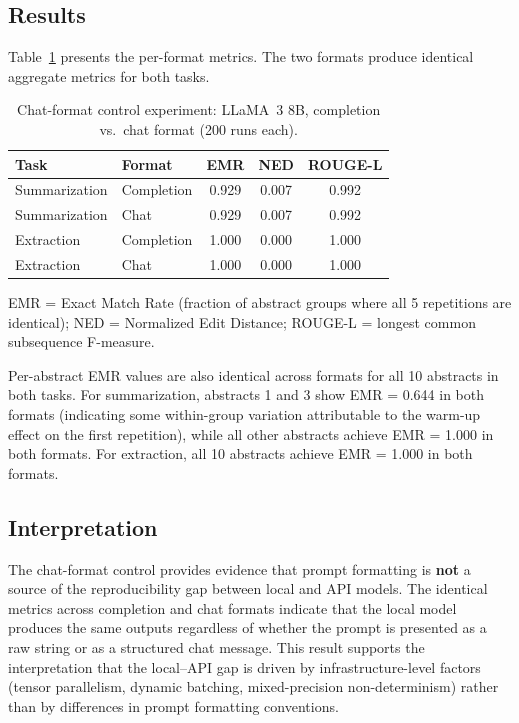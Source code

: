 \documentclass[11pt]{article}
\begin{document}
\subsection{Results}

Table~\ref{tab:chat-control} presents the per-format metrics. The two formats produce identical aggregate metrics for both tasks.

\begin{table}[H]
\centering
\caption{Chat-format control experiment: LLaMA~3 8B, completion vs.\ chat format (200 runs each).}
\label{tab:chat-control}
\small
\begin{tabular}{@{}llccc@{}}
\toprule
\textbf{Task} & \textbf{Format} & \textbf{EMR} & \textbf{NED} & \textbf{ROUGE-L} \\
\midrule
Summarization & Completion & 0.929 & 0.007 & 0.992 \\
Summarization & Chat       & 0.929 & 0.007 & 0.992 \\
\addlinespace
Extraction    & Completion & 1.000 & 0.000 & 1.000 \\
Extraction    & Chat       & 1.000 & 0.000 & 1.000 \\
\bottomrule
\end{tabular}
\par\smallskip\raggedright\footnotesize
EMR = Exact Match Rate (fraction of abstract groups where all 5 repetitions are identical); NED = Normalized Edit Distance; ROUGE-L = longest common subsequence F-measure.
\end{table}

\noindent Per-abstract EMR values are also identical across formats for all 10 abstracts in both tasks. For summarization, abstracts 1 and 3 show EMR = 0.644 in both formats (indicating some within-group variation attributable to the warm-up effect on the first repetition), while all other abstracts achieve EMR = 1.000 in both formats. For extraction, all 10 abstracts achieve EMR = 1.000 in both formats.

\subsection{Interpretation}

The chat-format control provides evidence that prompt formatting is \textbf{not} a source of the reproducibility gap between local and API models. The identical metrics across completion and chat formats indicate that the local model produces the same outputs regardless of whether the prompt is presented as a raw string or as a structured chat message. This result supports the interpretation that the local--API gap is driven by infrastructure-level factors (tensor parallelism, dynamic batching, mixed-precision non-determinism) rather than by differences in prompt formatting conventions.
\end{document}
